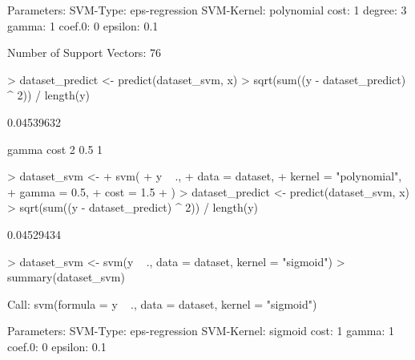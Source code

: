 \documentclass{article}
\begin{document}
\begin{Schunk}
\begin{Soutput}
Parameters:
   SVM-Type:  eps-regression 
 SVM-Kernel:  polynomial 
       cost:  1 
     degree:  3 
      gamma:  1 
     coef.0:  0 
    epsilon:  0.1 


Number of Support Vectors:  76
\end{Soutput}
\begin{Sinput}
> dataset_predict <- predict(dataset_svm, x)
> sqrt(sum((y - dataset_predict) ^ 2)) / length(y)
\end{Sinput}
\begin{Soutput}
[1] 0.04539632
\end{Soutput}
\begin{Soutput}
  gamma cost
2   0.5    1
\end{Soutput}
\begin{Sinput}
> dataset_svm <-
+   svm(
+     y ~ .,
+     data = dataset,
+     kernel = "polynomial",
+     gamma = 0.5,
+     cost = 1.5
+   )
> dataset_predict <- predict(dataset_svm, x)
> sqrt(sum((y - dataset_predict) ^ 2)) / length(y)
\end{Sinput}
\begin{Soutput}
[1] 0.04529434
\end{Soutput}
\begin{Sinput}
> dataset_svm <- svm(y ~ ., data = dataset, kernel = "sigmoid")
> summary(dataset_svm)
\end{Sinput}
\begin{Soutput}
Call:
svm(formula = y ~ ., data = dataset, kernel = "sigmoid")


Parameters:
   SVM-Type:  eps-regression 
 SVM-Kernel:  sigmoid 
       cost:  1 
      gamma:  1 
     coef.0:  0 
    epsilon:  0.1 



\end{Soutput}
\end{Schunk}
\end{document}
